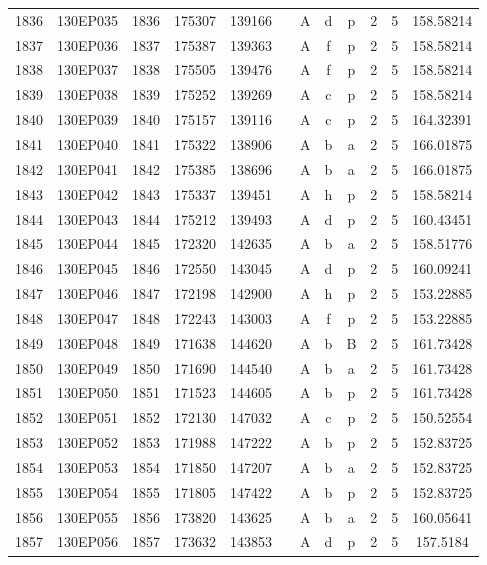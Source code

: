 \begin{tabular}{|*{12}{c|}}
1836 & 130EP035 & 1836 & 175307 & 139166 &  & A & d & p & 2 & 5 & 158.58214 \\ 
1837 & 130EP036 & 1837 & 175387 & 139363 &  & A & f & p & 2 & 5 & 158.58214 \\ 
1838 & 130EP037 & 1838 & 175505 & 139476 &  & A & f & p & 2 & 5 & 158.58214 \\ 
1839 & 130EP038 & 1839 & 175252 & 139269 &  & A & c & p & 2 & 5 & 158.58214 \\ 
1840 & 130EP039 & 1840 & 175157 & 139116 &  & A & c & p & 2 & 5 & 164.32391 \\ 
1841 & 130EP040 & 1841 & 175322 & 138906 &  & A & b & a & 2 & 5 & 166.01875 \\ 
1842 & 130EP041 & 1842 & 175385 & 138696 &  & A & b & a & 2 & 5 & 166.01875 \\ 
1843 & 130EP042 & 1843 & 175337 & 139451 &  & A & h & p & 2 & 5 & 158.58214 \\ 
1844 & 130EP043 & 1844 & 175212 & 139493 &  & A & d & p & 2 & 5 & 160.43451 \\ 
1845 & 130EP044 & 1845 & 172320 & 142635 &  & A & b & a & 2 & 5 & 158.51776 \\ 
1846 & 130EP045 & 1846 & 172550 & 143045 &  & A & d & p & 2 & 5 & 160.09241 \\ 
1847 & 130EP046 & 1847 & 172198 & 142900 &  & A & h & p & 2 & 5 & 153.22885 \\ 
1848 & 130EP047 & 1848 & 172243 & 143003 &  & A & f & p & 2 & 5 & 153.22885 \\ 
1849 & 130EP048 & 1849 & 171638 & 144620 &  & A & b & B & 2 & 5 & 161.73428 \\ 
1850 & 130EP049 & 1850 & 171690 & 144540 &  & A & b & a & 2 & 5 & 161.73428 \\ 
1851 & 130EP050 & 1851 & 171523 & 144605 &  & A & b & p & 2 & 5 & 161.73428 \\ 
1852 & 130EP051 & 1852 & 172130 & 147032 &  & A & c & p & 2 & 5 & 150.52554 \\ 
1853 & 130EP052 & 1853 & 171988 & 147222 &  & A & b & p & 2 & 5 & 152.83725 \\ 
1854 & 130EP053 & 1854 & 171850 & 147207 &  & A & b & a & 2 & 5 & 152.83725 \\ 
1855 & 130EP054 & 1855 & 171805 & 147422 &  & A & b & p & 2 & 5 & 152.83725 \\ 
1856 & 130EP055 & 1856 & 173820 & 143625 &  & A & b & a & 2 & 5 & 160.05641 \\ 
1857 & 130EP056 & 1857 & 173632 & 143853 &  & A & d & p & 2 & 5 & 157.5184 \\ 

\end{tabular}
